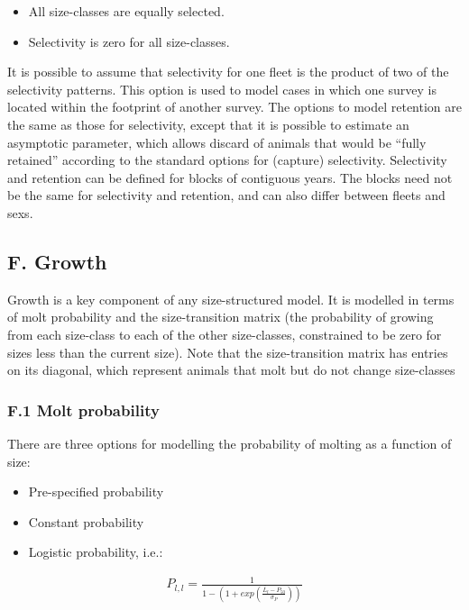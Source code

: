 \documentclass[]{article}
\providecommand{\tightlist}{%
  \setlength{\itemsep}{0pt}\setlength{\parskip}{0pt}}
\begin{document}
\begin{itemize}
\tightlist
\item
  All size-classes are equally selected.
\item
  Selectivity is zero for all size-classes.
\end{itemize}

It is possible to assume that selectivity for one fleet is the product
of two of the selectivity patterns. This option is used to model cases
in which one survey is located within the footprint of another survey.
The options to model retention are the same as those for selectivity,
except that it is possible to estimate an asymptotic parameter, which
allows discard of animals that would be ``fully retained'' according to
the standard options for (capture) selectivity. Selectivity and
retention can be defined for blocks of contiguous years. The blocks need
not be the same for selectivity and retention, and can also differ
between fleets and sexs.

\subsection{F. Growth}\label{f.-growth}

Growth is a key component of any size-structured model. It is modelled
in terms of molt probability and the size-transition matrix (the
probability of growing from each size-class to each of the other
size-classes, constrained to be zero for sizes less than the current
size). Note that the size-transition matrix has entries on its diagonal,
which represent animals that molt but do not change size-classes

\subsubsection{F.1 Molt probability}\label{f.1-molt-probability}

There are three options for modelling the probability of molting as a
function of size:

\begin{itemize}
\tightlist
\item
  Pre-specified probability
\item
  Constant probability
\item
  Logistic probability, i.e.:
\end{itemize}

\begin{align}
  P_{l,l} = \frac {1}{1-(1+exp(\frac{\bar{L}_{l}-P_{50}}{\sigma_{P}}))}
 \end{align}
\end{document}
